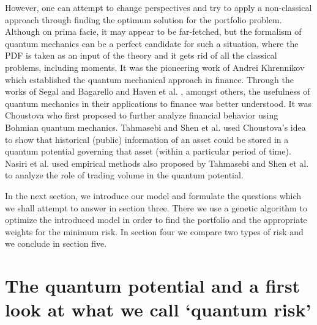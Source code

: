 \documentclass[ aip,jmp,reprint]{revtex4-2}
\begin{document}
However, one can attempt to change perspectives and try to apply a
non-classical approach through finding the optimum solution for the
portfolio problem. Although on prima facie, it may appear to be far-fetched,
but the formalism of quantum mechanics can be a perfect candidate for such a
situation, where the PDF is taken as an input of the theory and it gets rid
of all the classical problems, including moments. It was the pioneering work
of Andrei Khrennikov \cite{AKhrennikov1}\cite{AKhrennikov2} which
established the quantum mechanical approach in finance. Through the works of
Segal \cite{Segal} and Bagarello \cite{FBagarello1}\cite{FBagarello2} and
Haven et al. \cite{Haven}, amongst others, the usefulness of quantum
mechanics in their applications to finance was better understood. It was
Choustova \cite{Choustova1} who first proposed to further analyze financial
behavior using Bohmian quantum mechanics. Tahmasebi \cite{Tahmasebi} and
Shen et al.\cite{Shen} used Choustova's idea to show that historical
(public) information of an asset could be stored in a quantum potential
governing that asset (within a particular period of time). Nasiri et al.\cite%
{Nasiri1}\cite{Nasiri2} used empirical methods also proposed by Tahmasebi
and Shen et al. \cite{Shen} to analyze the role of trading volume in the
quantum potential.

In the next section, we introduce our model and formulate the questions
which we shall attempt to answer in section three. There we use a genetic
algorithm to optimize the introduced model in order to find the portfolio
and the appropriate weights for the minimum risk. In section four we compare
two types of risk and we conclude in section five.

\section{The quantum potential and a first look at what we call `quantum
risk' }
\end{document}
